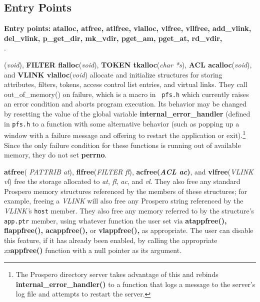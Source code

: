 \subsection{Entry Points}

\begin{tabbing}
{\Large \bf Entry points:} \= {\bf atalloc, atfree, atlfree, vlalloc,
vlfree, vllfree, add\_vlink,}\\ 
\> {\bf del\_vlink, p\_get\_dir, mk\_vdir, pget\_am, pget\_at, rd\_vdir,}\\
. 
\end{tabbing}

({\it void}), {\bf FILTER flalloc}({\it void}), {\bf TOKEN
tkalloc}({\it char *s}), {\bf ACL acalloc}({\it void}), and {\bf VLINK
vlalloc}({\it void}) allocate and initialize structures for storing attributes,
filters, tokens, access control list entries, and virtual links.
They call out\_of\_memory() on failure, which is a macro in {\tt
pfs.h} which currently raises an error condition and aborts program
execution.  Its behavior may be changed by resetting the value of the
global variable {\bf internal\_error\_handler} (defined in {\tt pfs.h}
to a function with some alternative behavior (such as popping up a 
window with a failure message and offering to restart the application
or exit).\footnote{
	The Prospero directory server takes advantage of this and
rebinds {\bf internal\_error\_handler()} to a function that logs a
message to the server's log file and attempts to restart the server.}
Since the only failure condition for these functions is running out of
available memory, they do not set {\bf perrno}.  

{\bf atfree}({\it
PATTRIB at}), {\bf flfree}({\it FILTER fl}), {\bf acfree({\it ACL
ac})}, and {\bf vlfree}({\it VLINK vl}) free the storage allocated to
{\it at}, {\it fl}, {\it ac}, and {\it vl}.  They also free any
standard Prospero memory structures referenced by the members of these
structures; for example, freeing a {\it VLINK} will also free any
Prospero string referenced by the {\it VLINK'\/}s {\tt host} member.
They also free any memory referred to by the structure's {\tt app.ptr}
member, using whatever function the user set via {\bf atappfree(),
flappfree(), acappfree(),} or {\bf vlappfree(),} as appropriate.  The
user can disable this feature, if it has already been enabled, by
calling the appropriate {\it xx}{\bf appfree()} function with a null
pointer as its argument.

